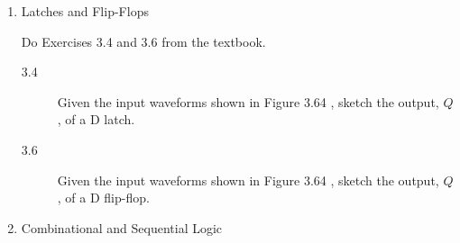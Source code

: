 \documentclass{e85}
\begin{document}
\begin{enumerate}
\begin{center}
  \end{center}
  \begin{solution}
  \end{solution}

\item Latches and Flip-Flops

  Do Exercises 3.4 and 3.6 from the textbook.
  \newcommand{\waveform}[1]{
    foreach \x/\y in {#1} {
      -- ++(\x,0) -- ++(.25,\y)
    }
  }
  \newcommand{\inputwaveforms}{
    \draw
    (0,0) node[above]{CLK}
    \waveform{
      1.25/1,
      1/-1,
      1.75/1,
      .625/-1,
      1.75/1,
      .875/-1,
      .5/1,
      2/-1,
      1.25/1
    }
    -- +(1.25,0)

    (0,-1.5) node[above]{D}
    \waveform{
      1.875/1,
      1/-1,
      .5/1,
      .875/-1,
      .875/1,
      1.375/-1,
      1.75/1,
      .375/-1,
      .375/1,
      2.125/-1
    }
    -- +(.875,0);
  }
  \begin{description}
  \item[3.4] Given the input waveforms shown in Figure 3.64 \figurebelow, sketch
    the output, \(Q\), of a D latch.
    \begin{center}
    \end{center}
    \begin{solution}
    \end{solution}

  \item[3.6] Given the input waveforms shown in Figure 3.64
    \figurebelow, sketch the output, \(Q\), of a D flip-flop.
    \begin{center}
    \end{center}
    \begin{solution}
    \end{solution}
  \end{description}

\item Combinational and Sequential Logic


\end{enumerate}
\end{document}
